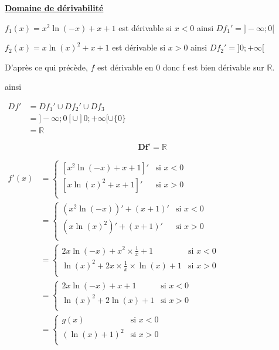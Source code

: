 \documentclass[12pt,a4paper]{article}
\begin{document}
\begin{enumerate}
\textbf{\underline{Domaine de dérivabilité}}

\( f_{1}(x)=x^2 \ln(-x) + x + 1 \) est dérivable si \( x < 0 \) ainsi \( Df_{1}' = ]-\infty;0[\) 

\( f_{2}(x)=x \ln(x)^2 + x + 1  \) est dérivable si \(  x > 0 \) ainsi \( Df_{2}' = ]0;+\infty[\) 

D'après ce qui précède, \(f\) est dérivable en 0 donc f est bien dérivable sur \(\mathbb{R}\).

ainsi 

\( 
\begin{aligned}
    Df'&=Df_{1}' \cup Df_{2}' \cup Df_{3}\\
        &=]-\infty;0[ \cup ]0;+\infty[ \cup  \{0\}\\
        &=\mathbb{R}
\end{aligned} 
\)

\begin{resultbox}
    \[
        \mathbf{Df'=\mathbb{R} }
    \]
\end{resultbox} 

\(
\begin{aligned}
        f'(x) &=
    \begin{cases}
        [x^2 \ln(-x) + x + 1]' & \text{si } x < 0 \\
        [x \ln(x)^2 + x + 1]'  & \text{si } x > 0 \\
    \end{cases}\\
    &=
    \begin{cases}
        (x^2 \ln(-x))' + (x + 1)' & \text{si } x < 0 \\
        (x \ln(x)^2)' + (x + 1)'  & \text{si } x > 0 \\
    \end{cases}\\
    &=
    \begin{cases}
        2x \ln(-x) + x^2\times\frac{1}{x} + 1 & \text{si } x < 0 \\
        \ln(x)^2+2x\times\frac{1}{x}\times\ln(x) + 1  & \text{si } x > 0 \\
    \end{cases}\\
    &=
    \begin{cases}
        2x \ln(-x) + x + 1 & \text{si } x < 0 \\
        \ln(x)^2+2\ln(x) + 1  & \text{si } x > 0 \\
    \end{cases}\\
    &=
    \begin{cases}
        g(x) & \text{si } x < 0 \\
        (\ln(x)+1)^{2}  & \text{si } x > 0 \\
    \end{cases}\\
\end{aligned}
\)
\end{enumerate}
\end{document}
